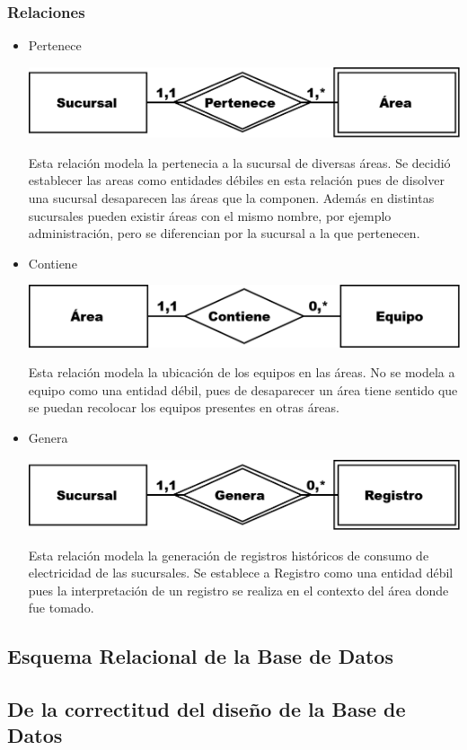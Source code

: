 \documentclass{article}
\begin{document}
\subsubsection{Relaciones}
\begin{itemize}
\item Pertenece

\includegraphics[scale=0.5]{Imagenes/Informe1/RelacionPertenece.png}

Esta relación modela la pertenecia a la sucursal de diversas áreas. Se decidió establecer las areas como entidades débiles
en esta relación pues de disolver una sucursal desaparecen las áreas que la componen. Además en distintas sucursales pueden
existir áreas con el mismo nombre, por ejemplo administración, pero se diferencian por la sucursal a la que pertenecen.

\item Contiene

\includegraphics[scale=0.5]{Imagenes/Informe1/RelacionContiene.png}

Esta relación modela la ubicación de los equipos en las áreas. No se modela a equipo como una entidad débil, pues de desaparecer un área
tiene sentido que se puedan recolocar los equipos presentes en otras áreas.

\item Genera

\includegraphics[scale=0.5]{Imagenes/Informe1/RelacionGenera.png}

Esta relación modela la generación de registros históricos de consumo de electricidad de las sucursales. Se establece a Registro como
una entidad débil pues la interpretación de un registro se realiza en el contexto del área donde fue tomado.

\end{itemize}

\subsection{Esquema Relacional de la Base de Datos}

\subsection{De la correctitud del diseño de la Base de Datos}
\end{document}
